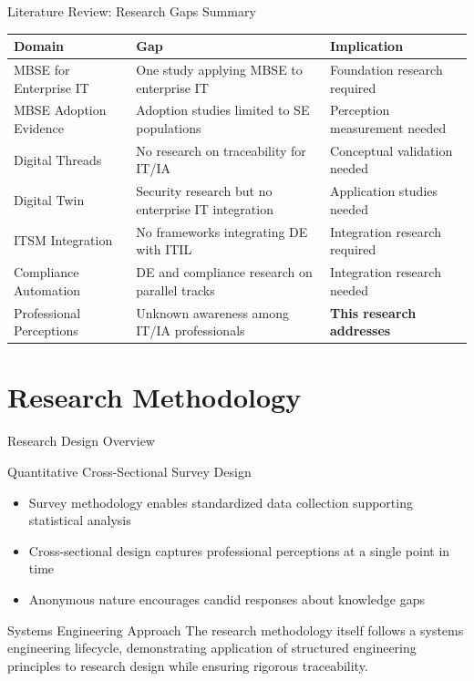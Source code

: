 \documentclass{beamer}
\begin{document}
\begin{frame}[allowframebreaks]{Literature Review: Research Gaps Summary}
  \begin{table}[H]
    \begin{scriptsize}
      \begin{tabular}{@{}p{1.1in}p{1.5in}p{1.5in}@{}}
        \toprule
        \textbf{Domain} & \textbf{Gap} & \textbf{Implication} \\
        \midrule
        MBSE for Enterprise IT & One study applying MBSE to enterprise IT & Foundation research required \\
        MBSE Adoption Evidence & Adoption studies limited to SE populations & Perception measurement needed \\
        Digital Threads & No research on traceability for IT/IA & Conceptual validation needed \\
        Digital Twin & Security research but no enterprise IT integration & Application studies needed \\
        ITSM Integration & No frameworks integrating DE with ITIL & Integration research required \\
        Compliance Automation & DE and compliance research on parallel tracks & Integration research needed \\
        Professional Perceptions & Unknown awareness among IT/IA professionals & \textbf{This research addresses} \\
        \bottomrule
      \end{tabular}
    \end{scriptsize}
  \end{table}
\end{frame}

\section{Research Methodology}
\begin{frame}[allowframebreaks]{Research Design Overview}
  \begin{block}{Quantitative Cross-Sectional Survey Design}
    \begin{itemize}
      \item Survey methodology enables standardized data collection supporting statistical analysis
      \item Cross-sectional design captures professional perceptions at a single point in time
      \item Anonymous nature encourages candid responses about knowledge gaps
    \end{itemize}
  \end{block}

  \begin{block}{Systems Engineering Approach}
    The research methodology itself follows a systems engineering lifecycle, demonstrating application of structured engineering principles to research design while ensuring rigorous traceability.
  \end{block}
\end{frame}
\end{document}
